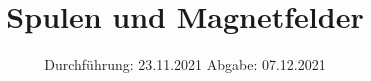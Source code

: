 

\subject{Versuch V308}
\title{Spulen und Magnetfelder}
\date{%
  Durchführung: 23.11.2021
  \hspace{3em}
  Abgabe: 07.12.2021
}



\maketitle
\thispagestyle{empty}
\tableofcontents
\newpage







\printbibliography{}

